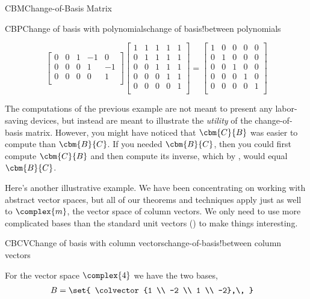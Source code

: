 \begin{subsect}{CBM}{Change-of-Basis Matrix}
\begin{example}{CBP}{Change of basis with polynomials}{change of basis!between polynomials}
\begin{para}
\begin{equation*}
\begin{bmatrix}
0 & 0 & 1 &-1 & 0\\
0 & 0 & 0 & 1 &-1\\
0 & 0 & 0 & 0 & 1\\
\end{bmatrix}
%
\begin{bmatrix}
1 & 1 & 1 & 1 & 1\\
0 & 1 & 1 & 1 & 1\\
0 & 0 & 1 & 1 & 1\\
0 & 0 & 0 & 1 & 1\\
0 & 0 & 0 & 0 & 1\\
\end{bmatrix}
=
\begin{bmatrix}
1 & 0 & 0 & 0 & 0\\
0 & 1 & 0 & 0 & 0\\
0 & 0 & 1 & 0 & 0\\
0 & 0 & 0 & 1 & 0\\
0 & 0 & 0 & 0 & 1\\
\end{bmatrix}
%
\end{equation*}
\end{para}
%
\end{example}
%
\begin{para}The computations of the previous example are not meant to present any labor-saving devices, but instead are meant to illustrate the {\em utility} of the change-of-basis matrix.  However, you might have noticed that $\cbm{C}{B}$ was easier to compute than $\cbm{B}{C}$.  If you needed $\cbm{B}{C}$, then you could first compute $\cbm{C}{B}$ and then compute its inverse, which by , would equal $\cbm{B}{C}$.\end{para}
%
\begin{para}Here's another illustrative example.  We have been concentrating on working with abstract vector spaces, but all of our theorems and techniques apply just as well to $\complex{m}$, the vector space of column vectors.  We only need to use more complicated bases than the standard unit vectors () to make things interesting.\end{para}
%
\begin{example}{CBCV}{Change of basis with column vectors}{change-of-basis!between column vectors}
\begin{para}For the vector space $\complex{4}$ we have the two bases,
%
\begin{align*}
B&=\set{
\colvector{1 \\ -2 \\ 1 \\ -2},\,
}
\end{align*}
\end{para}
\end{example}
\end{subsect}
